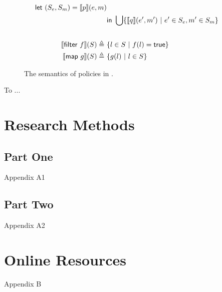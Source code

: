 \documentclass[sigconf,usenames,dvipsnames,svgnames,table]{acmart}
\begin{document}
\begin{figure}
\begin{align*}
              \mathsf{let}\ (S_e, S_m) = \llbracket p \rrbracket(e, m)\\
              &\mathsf{in}\ \bigcup \{\llbracket q \rrbracket(e',m')\ |\ e'\in S_e, m'\in S_m\}\\
              \\
            \llbracket \mathsf{filter}\ f \rrbracket(S)
              \triangleq\ & \{l \in S\ |\ f(l) = \mathsf{true}\}\\
            \llbracket \mathsf{map}\ g \rrbracket(S)
              \triangleq\ &
              \{ g(l)\ |\ l\in S \} 
          \end{align*}
          \caption{The semantics of policies in \sysname.}
          \label{fig:spec:sem:pol}
        \end{figure}
\begin{acks}
To ...
\end{acks}




\appendix

\section{Research Methods}

\subsection{Part One}

Appendix A1

\subsection{Part Two}

Appendix A2

\section{Online Resources}

Appendix B
\end{document}
